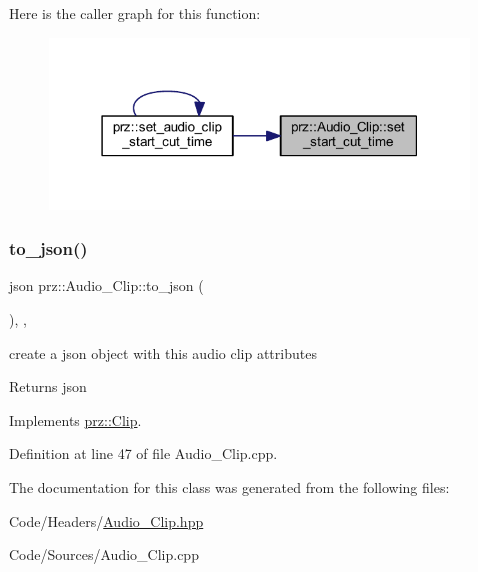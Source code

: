 Here is the caller graph for this function\+:
\nopagebreak
\begin{figure}[H]
\begin{center}
\leavevmode
\includegraphics[width=316pt]{classprz_1_1_audio___clip_ae2daaa8e064720fdecf051c63660edd5_icgraph}
\end{center}
\end{figure}
\mbox{\label{classprz_1_1_audio___clip_a15fdef4e8547e25d06785d816be71a12}} 
\subsubsection{\texorpdfstring{to\_json()}{to\_json()}}
{\footnotesize\ttfamily json prz\+::\+Audio\+\_\+\+Clip\+::to\+\_\+json (\begin{DoxyParamCaption}{ }\end{DoxyParamCaption})\hspace{0.3cm}{\ttfamily [final]}, {\ttfamily [override]}, {\ttfamily [virtual]}}



create a json object with this audio clip attributes 

\begin{DoxyReturn}{Returns}
json 
\end{DoxyReturn}


Implements \mbox{\hyperlink{classprz_1_1_clip_a4959ada0fab0fbac6cb5239578ac3ec6}{prz\+::\+Clip}}.



Definition at line 47 of file Audio\+\_\+\+Clip.\+cpp.



The documentation for this class was generated from the following files\+:\begin{DoxyCompactItemize}
\item 
Code/\+Headers/\mbox{\hyperlink{_audio___clip_8hpp}{Audio\+\_\+\+Clip.\+hpp}}\item 
Code/\+Sources/Audio\+\_\+\+Clip.\+cpp\end{DoxyCompactItemize}

